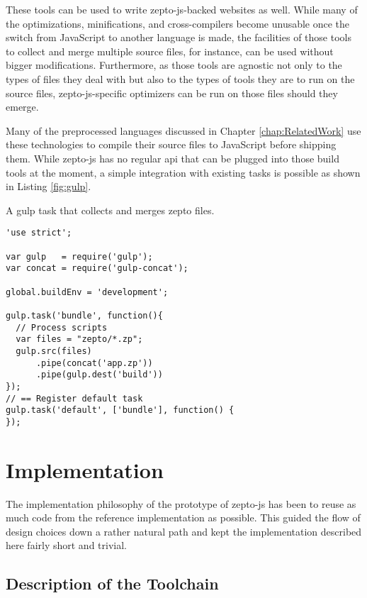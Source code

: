 \documentclass[oneside,11pt,xetex]{scrbook}
\begin{document}
These tools can be used to write zepto-js-backed websites as well. While many of
the optimizations, minifications, and cross-compilers become unusable once the switch
from JavaScript to another language is made, the facilities of those tools to collect
and merge multiple source files, for instance, can be used without bigger modifications.
Furthermore, as those tools are agnostic not only to the types of files they deal with
but also to the types of tools they are to run on the source files, zepto-js-specific
optimizers can be run on those files should they emerge.

Many of the preprocessed languages discussed in Chapter \ref{chap:RelatedWork} use these
technologies to compile their source files to JavaScript before shipping them.
While zepto-js has no regular \gls{api} that can be plugged into those build tools
at the moment, a simple integration with existing tasks is possible as shown in
Listing \ref{fig:gulp}.

\begin{listing}[H]
\caption{A gulp task that collects and merges zepto files.}
\begin{verbatim}
'use strict';

var gulp   = require('gulp');
var concat = require('gulp-concat');

global.buildEnv = 'development';

gulp.task('bundle', function(){
  // Process scripts
  var files = "zepto/*.zp";
  gulp.src(files)
      .pipe(concat('app.zp'))
      .pipe(gulp.dest('build'))
});
// == Register default task
gulp.task('default', ['bundle'], function() {
});
\end{verbatim}
\label{fig:gulp}
\end{listing}

\chapter{Implementation}
\label{chap:Implementation}

The implementation philosophy of the prototype of zepto-js has been to reuse as much
code from the reference implementation as possible. This guided the flow of design choices
down a rather natural path and kept the implementation described here fairly short and trivial.

\section{Description of the Toolchain}
\end{document}
